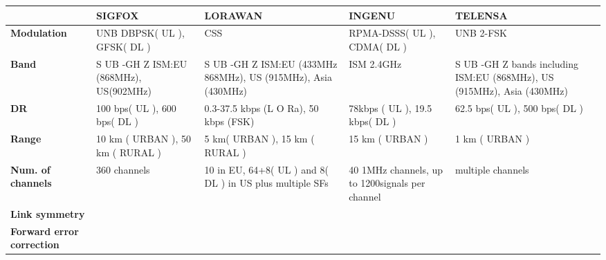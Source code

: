 \begin{table}[h!]
\scriptsize
	\begin{tabulary}{\textwidth}{L|L|L|L|L}
	\                                             & \textbf{SIGFOX}                               & \textbf{LORAWAN}                                              & \textbf{INGENU}                                 & \textbf{TELENSA} \\\hline                                                              
	\textbf{Modulation}                           & UNB DBPSK( UL ), GFSK( DL )                   & CSS                                                           & RPMA-DSSS( UL ), CDMA( DL )                     & UNB 2-FSK \\\hline                                                             
	\textbf{Band}                                 & S UB -GH Z ISM:EU (868MHz), US(902MHz)        & S UB -GH Z ISM:EU (433MHz 868MHz), US (915MHz), Asia (430MHz) & ISM 2.4GHz                                      & S UB -GH Z bands including ISM:EU (868MHz), US (915MHz), Asia (430MHz) \\\hline
	\textbf{\ac{DR}}                              & 100 bps( UL ), 600 bps( DL )                  & 0.3-37.5 kbps (L O Ra), 50 kbps (FSK)                         & 78kbps ( UL ), 19.5 kbps( DL )                  & 62.5 bps( UL ), 500 bps( DL ) \\\hline                                         
	\textbf{Range}                                & 10 km ( URBAN ), 50 km ( RURAL )              & 5 km( URBAN ), 15 km ( RURAL )                                & 15 km ( URBAN )                                 & 1 km ( URBAN ) \\\hline                                                        
	\textbf{Num. of channels                    } & 360 channels                                  & 10 in EU, 64+8( UL ) and 8( DL ) in US plus multiple SFs      & 40 1MHz channels, up to 1200signals per channel & multiple channels \\\hline                                                     
	\textbf{Link symmetry}                        & \ko                                           & \ok                                                           & \ko                                             & \ko \\\hline                                                                   
	\textbf{Forward error correction}             & \ko                                           & \ok                                                           & \ok                                             & \ok \\\hline                                                                   

\end{tabulary}
\end{table}
